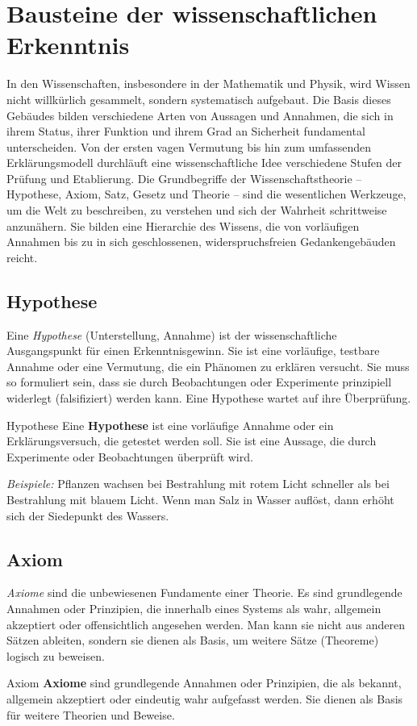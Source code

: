 \section{Bausteine der wissenschaftlichen Erkenntnis}\label{sec: Wissenschaftliche_Erkenntnis}
In den Wissenschaften, insbesondere in der Mathematik und Physik, wird Wissen nicht willkürlich gesammelt, sondern systematisch aufgebaut. Die Basis dieses Gebäudes bilden verschiedene Arten von Aussagen und Annahmen, die sich in ihrem Status, ihrer Funktion und ihrem Grad an Sicherheit fundamental unterscheiden. Von der ersten vagen Vermutung bis hin zum umfassenden Erklärungsmodell durchläuft eine wissenschaftliche Idee verschiedene Stufen der Prüfung und Etablierung. Die Grundbegriffe der Wissenschaftstheorie – Hypothese, Axiom, Satz, Gesetz und Theorie – sind die wesentlichen Werkzeuge, um die Welt zu beschreiben, zu verstehen und sich der Wahrheit schrittweise anzunähern. Sie bilden eine Hierarchie des Wissens, die von vorläufigen Annahmen bis zu in sich geschlossenen, widerspruchsfreien Gedankengebäuden reicht.
\subsection{Hypothese}\label{subsec: Hypothese}
Eine \textit{Hypothese} (Unterstellung, Annahme) ist der wissenschaftliche Ausgangspunkt für einen Erkenntnisgewinn. Sie ist eine vorläufige, testbare Annahme oder eine Vermutung, die ein Phänomen zu erklären versucht. Sie muss so formuliert sein, dass sie durch Beobachtungen oder Experimente prinzipiell widerlegt (falsifiziert) werden kann. Eine Hypothese wartet auf ihre Überprüfung.
\begin{rememberbox}[]{Hypothese}
    Eine \textbf{Hypothese} ist eine vorläufige Annahme oder ein Erklärungsversuch, die getestet werden soll. Sie ist eine Aussage, die durch Experimente oder Beobachtungen überprüft wird. 
\end{rememberbox}

\textit{Beispiele:}\newline
Pflanzen wachsen bei Bestrahlung mit rotem Licht schneller als bei Bestrahlung mit blauem Licht.\newline
Wenn man Salz in Wasser auflöst, dann erhöht sich der Siedepunkt des Wassers. 


\subsection{Axiom}\label{subsec: Axiom}
\textit{Axiome} sind die unbewiesenen Fundamente einer Theorie. Es sind grundlegende Annahmen oder Prinzipien, die innerhalb eines Systems als wahr, allgemein akzeptiert oder offensichtlich angesehen werden. Man kann sie nicht aus anderen Sätzen ableiten, sondern sie dienen als Basis, um weitere Sätze (Theoreme) logisch zu beweisen.
\begin{rememberbox}[]{Axiom}
    \textbf{Axiome} sind grundlegende Annahmen oder Prinzipien, die als bekannt, allgemein akzeptiert oder eindeutig wahr aufgefasst werden. Sie dienen als Basis für weitere Theorien und Beweise. 
\end{rememberbox}

